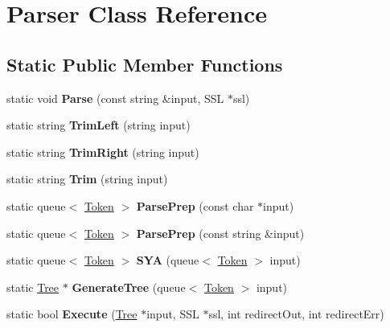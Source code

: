 \hypertarget{classParser}{\section{Parser Class Reference}
\label{classParser}
}
\subsection*{Static Public Member Functions}
\begin{DoxyCompactItemize}
\item 
\hypertarget{classParser_a1622dd8a55a1c87346f8bae8841872ff}{static void {\bfseries Parse} (const string \&input, S\-S\-L $\ast$ssl)}\label{classParser_a1622dd8a55a1c87346f8bae8841872ff}

\item 
\hypertarget{classParser_a98223ac81cb65d86b901a9218e25bf57}{static string {\bfseries Trim\-Left} (string input)}\label{classParser_a98223ac81cb65d86b901a9218e25bf57}

\item 
\hypertarget{classParser_a2252f0fb8a66f55c124e6c6b2ca3f4bb}{static string {\bfseries Trim\-Right} (string input)}\label{classParser_a2252f0fb8a66f55c124e6c6b2ca3f4bb}

\item 
\hypertarget{classParser_a91a0ce28c8cc4f6fb5f6c24998758c95}{static string {\bfseries Trim} (string input)}\label{classParser_a91a0ce28c8cc4f6fb5f6c24998758c95}

\item 
\hypertarget{classParser_a85d99169d8498e1a9dcfd12331dac704}{static queue$<$ \hyperlink{classToken}{Token} $>$ {\bfseries Parse\-Prep} (const char $\ast$input)}\label{classParser_a85d99169d8498e1a9dcfd12331dac704}

\item 
\hypertarget{classParser_a58555d8ba0b62bd7b2bac2a7362d3a84}{static queue$<$ \hyperlink{classToken}{Token} $>$ {\bfseries Parse\-Prep} (const string \&input)}\label{classParser_a58555d8ba0b62bd7b2bac2a7362d3a84}

\item 
\hypertarget{classParser_abd17d1337e3b897df5e5707619c147db}{static queue$<$ \hyperlink{classToken}{Token} $>$ {\bfseries S\-Y\-A} (queue$<$ \hyperlink{classToken}{Token} $>$ input)}\label{classParser_abd17d1337e3b897df5e5707619c147db}

\item 
\hypertarget{classParser_abb030ab55697459ff435369a28f7afcc}{static \hyperlink{classTree}{Tree} $\ast$ {\bfseries Generate\-Tree} (queue$<$ \hyperlink{classToken}{Token} $>$ input)}\label{classParser_abb030ab55697459ff435369a28f7afcc}

\item 
\hypertarget{classParser_ae75fb3c91b46f693337665a6031a8103}{static bool {\bfseries Execute} (\hyperlink{classTree}{Tree} $\ast$input, S\-S\-L $\ast$ssl, int redirect\-Out, int redirect\-Err)}\label{classParser_ae75fb3c91b46f693337665a6031a8103}

\end{DoxyCompactItemize}

